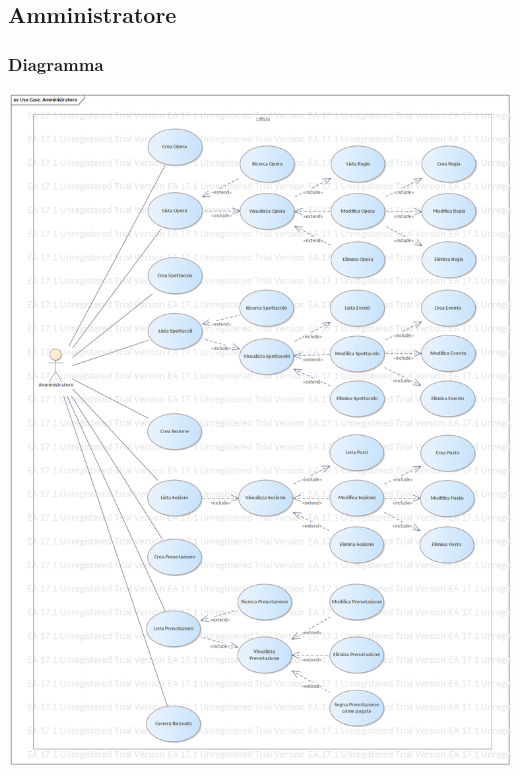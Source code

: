 \documentclass{article}
\begin{document}
        \subsection{Amministratore}
            \subsubsection{Diagramma}
                \includegraphics[width=\textwidth]{imgs/use_case/amministratore}
\end{document}
